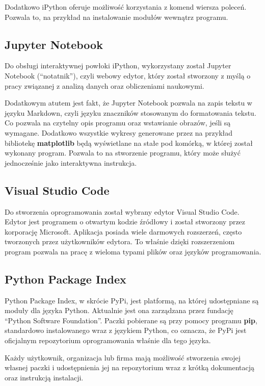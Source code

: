 \quad Dodatkowo iPython oferuje możliwość korzystania z komend wiersza poleceń. Pozwala to, na przykład na instalowanie modułów wewnątrz programu. 

\subsection{Jupyter Notebook}

\quad Do obsługi interaktywnej powłoki iPython, wykorzystany został Jupyter Notebook (\enquote{notatnik}), czyli webowy edytor, który został stworzony z myślą o pracy związanej z analizą danych oraz obliczeniami naukowymi. 

\quad Dodatkowym atutem jest fakt, że Jupyter Notebook pozwala na zapis tekstu w języku Markdown, czyli języku znaczników stosowanym do formatowania tekstu. Co pozwala na czytelny opis programu oraz wstawianie obrazów, jeśli są wymagane. Dodatkowo wszystkie wykresy generowane przez na przykład bibliotekę \textbf{matplotlib} będą wyświetlane na stałe pod komórką, w której został wykonany program. Pozwala to na stworzenie programu, który może służyć jednocześnie jako interaktywna instrukcja. 

\subsection{Visual Studio Code}

\quad Do stworzenia oprogramowania został wybrany edytor Visual Studio Code. Edytor jest programem o otwartym kodzie źródłowy i został stworzony przez korporację Microsoft. Aplikacja posiada wiele darmowych rozszerzeń, często tworzonych przez użytkowników edytora. To właśnie dzięki rozszerzeniom program pozwala na pracę z wieloma typami plików oraz języków programowania.  

\subsection{Python Package Index}
\quad Python Package Index, w skrócie PyPi, jest platformą, na której udostępniane są moduły dla języka Python. Aktualnie jest ona zarządzana przez fundację \enquote{Python Software Foundation}. Paczki pobierane są przy pomocy programu \textbf{pip}, standardowo instalowanego wraz z językiem Python, co oznacza, że PyPi jest oficjalnym repozytorium oprogramowania właśnie dla tego języka. 

\quad Każdy użytkownik, organizacja lub firma mają możliwość stworzenia swojej własnej paczki i udostępnienia jej na repozytorium wraz z krótką dokumentacją oraz instrukcją instalacji.

